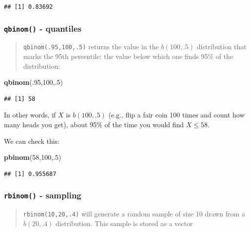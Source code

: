 \documentclass[
]{book}
\newenvironment{Shaded}{\begin{snugshade}}{\end{snugshade}}
\newcommand{\DecValTok}[1]{\textcolor[rgb]{0.00,0.00,0.81}{#1}}
\newcommand{\FunctionTok}[1]{\textcolor[rgb]{0.13,0.29,0.53}{\textbf{#1}}}
\newcommand{\NormalTok}[1]{#1}
\theoremstyle{definition}
\theoremstyle{definition}
\theoremstyle{definition}
\theoremstyle{definition}
\theoremstyle{remark}
\begin{document}
\begin{verbatim}
## [1] 0.83692
\end{verbatim}

\subsubsection{\texorpdfstring{\texttt{qbinom()} - quantiles}{qbinom() - quantiles}}\label{qbinom---quantiles}

\begin{quote}
\texttt{qbinom(.95,100,.5)} returns the value in the \(b(100,.5)\) distribution that marks the 95th percentile: the value below which one finds 95\% of the distribution:
\end{quote}

\begin{Shaded}
\begin{Highlighting}[]
\FunctionTok{qbinom}\NormalTok{(.}\DecValTok{95}\NormalTok{,}\DecValTok{100}\NormalTok{,.}\DecValTok{5}\NormalTok{)}
\end{Highlighting}
\end{Shaded}

\begin{verbatim}
## [1] 58
\end{verbatim}

In other words, if \(X\) is \(b(100,.5)\) (e.g., flip a fair coin 100 times and count how many heads you get), about 95\% of the time you would find \(X \leq 58\).

We can check this:

\begin{Shaded}
\begin{Highlighting}[]
\FunctionTok{pbinom}\NormalTok{(}\DecValTok{58}\NormalTok{,}\DecValTok{100}\NormalTok{,.}\DecValTok{5}\NormalTok{)}
\end{Highlighting}
\end{Shaded}

\begin{verbatim}
## [1] 0.955687
\end{verbatim}

\subsubsection{\texorpdfstring{\texttt{rbinom()} - sampling}{rbinom() - sampling}}\label{rbinom---sampling}

\begin{quote}
\texttt{rbinom(10,20,.4)} will generate a random sample of size 10 drawn from a \(b(20,.4)\) distribution. This sample is stored as a vector
\end{quote}
\end{document}
